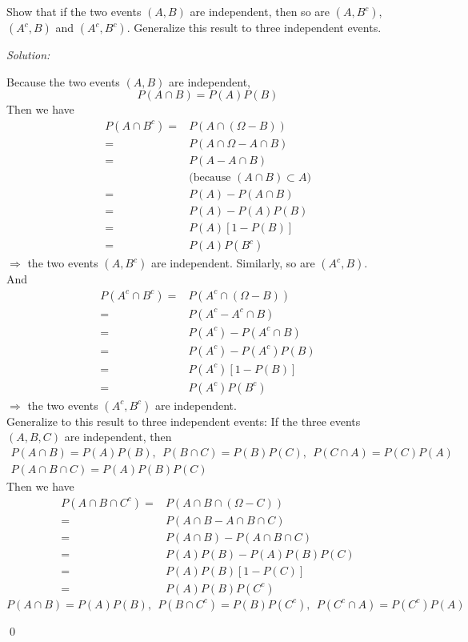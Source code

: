 \documentclass[12pt]{article}
\newenvironment{problem}[2][Problem]{\begin{trivlist}
\item[\hskip \labelsep {\bfseries #1}\hskip \labelsep {\bfseries #2.}]}{\end{trivlist}}
\newenvironment{sol}
    {\emph{Solution:}
    }
    {
    \qed
    }
\begin{document}
\begin{problem}{3}
Show that if the two events $(A,B)$ are independent, then so are $(A,B^c)$, $(A^c,B)$ and $(A^c,B^c)$. Generalize this result to three independent events. 
\end{problem}
\begin{sol}
Because the two events $(A,B)$ are independent,
\[
P(A\cap B)=P(A)P(B)
\]
Then we have
\begin{align*}
P(A\cap B^c)=&P(A\cap(\Omega-B))\\
=&P(A\cap\Omega-A\cap B)\\
=&P(A-A\cap B)\\
&\text{(because $(A\cap B)\subset A$)}\\
=&P(A)-P(A\cap B)\\
=&P(A)-P(A)P(B)\\
=&P(A)[1-P(B)]\\
=&P(A)P(B^c)
\end{align*}
$\Longrightarrow$ the two events $(A,B^c)$ are independent. Similarly, so are $(A^c,B)$.\\
And
\begin{align*}
P(A^c\cap B^c)=&P(A^c\cap(\Omega-B))\\
=&P(A^c-A^c\cap B)\\
=&P(A^c)-P(A^c\cap B)\\
=&P(A^c)-P(A^c)P(B)\\
=&P(A^c)[1-P(B)]\\
=&P(A^c)P(B^c)
\end{align*}
$\Longrightarrow$ the two events $(A^c,B^c)$ are independent.\\
Generalize to this result to three independent events: If the three events $(A,B,C)$ are independent, then
\begin{gather*}
P(A\cap B)=P(A)P(B),~~P(B\cap C)=P(B)P(C),~~P(C\cap A)=P(C)P(A)\\
P(A\cap B\cap C)=P(A)P(B)P(C)
\end{gather*}
Then we have
\begin{align*}
P(A\cap B\cap C^c)=&P(A\cap B\cap(\Omega-C))\\
=&P(A\cap B-A\cap B\cap C)\\
=&P(A\cap B)-P(A\cap B\cap C)\\
=&P(A)P(B)-P(A)P(B)P(C)\\
=&P(A)P(B)[1-P(C)]\\
=&P(A)P(B)P(C^c)
\end{align*}
\[
P(A\cap B)=P(A)P(B),~~P(B\cap C^c)=P(B)P(C^c),~~P(C^c\cap A)=P(C^c)P(A)
\]
\end{sol}
\end{document}

